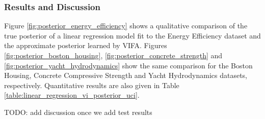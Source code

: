 \documentclass[msc,deptreport.inf]{infthesis} %
\begin{document}
\subsubsection{Results and Discussion}

Figure \ref{fig:posterior_energy_efficiency} shows a qualitative comparison of the true posterior of a linear regression model fit to the Energy Efficiency dataset and the approximate posterior learned by VIFA. Figures \ref{fig:posterior_boston_housing}, \ref{fig:posterior_concrete_strength} and \ref{fig:posterior_yacht_hydrodynamics} show the same comparison for the Boston Housing, Concrete Compressive Strength and Yacht Hydrodynamics datasets, respectively. Quantitative results are also given in Table \ref{table:linear_regression_vi_posterior_uci}.

TODO: add discussion once we add test results
\end{document}
